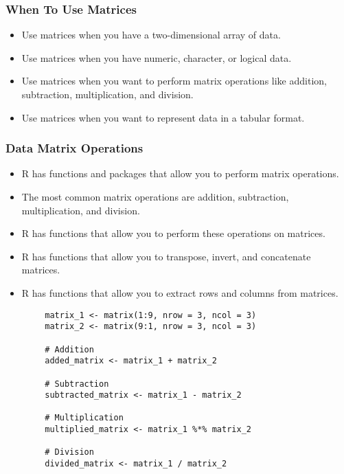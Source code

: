 \documentclass[serif, 9pt, aspectratio=32]{beamer}
\begin{document}
\begin{frame}
    \centering
    \frametitle{When To Use Matrices}
    \begin{itemize}
        \setlength{\itemsep}{2em}
        \item Use matrices when you have a two-dimensional array of data.
        \item Use matrices when you have numeric, character, or logical data.
        \item Use matrices when you want to perform matrix operations like addition, subtraction, multiplication, and division.
        \item Use matrices when you want to represent data in a tabular format.
    \end{itemize}
\end{frame}

\begin{frame}
    \centering
    \frametitle{Data Matrix Operations}
    \begin{itemize}
        \setlength{\itemsep}{2em}
        \item R has functions and packages that allow you to perform matrix operations.
        \item The most common matrix operations are addition, subtraction, multiplication, and division.
        \item R has functions that allow you to perform these operations on matrices.
        \item R has functions that allow you to transpose, invert, and concatenate matrices.
        \item R has functions that allow you to extract rows and columns from matrices.
    \end{itemize}
\end{frame}

\begin{frame}[fragile]
    \begin{lstlisting}
        matrix_1 <- matrix(1:9, nrow = 3, ncol = 3)
        matrix_2 <- matrix(9:1, nrow = 3, ncol = 3)

        # Addition
        added_matrix <- matrix_1 + matrix_2

        # Subtraction
        subtracted_matrix <- matrix_1 - matrix_2

        # Multiplication
        multiplied_matrix <- matrix_1 %*% matrix_2

        # Division
        divided_matrix <- matrix_1 / matrix_2
    \end{lstlisting}
\end{frame}
\end{document}
